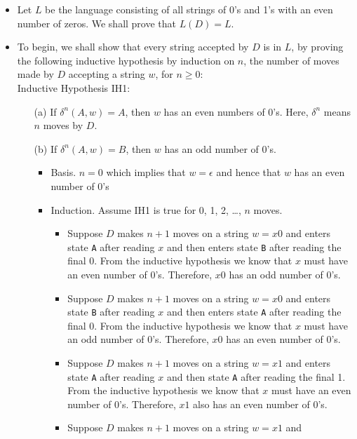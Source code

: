 \documentclass[]{article}
\begin{document}
\begin{itemize}
    \item Let $L$ be the language consisting of all strings of 0's and 1's with
    an even number of zeros. We shall prove that $L(D) = L$.
    \item To begin, we shall show that every string accepted by $D$ is in $L$,
    by proving the following inductive hypothesis by induction on $n$, the
    number of moves made by $D$ accepting a string $w$, for $n \geq 0$: \\
    Inductive Hypothesis IH1:
      \begin{enumerate}
        \item[(a)] If $\delta^n(A, w) = A$, then $w$ has an even numbers of 0's.
        Here, $\delta^n$ means $n$ moves by $D$.
        \item[(b)] If $\delta^n(A, w) = B$, then $w$ has an odd number of 0's.
          \begin{itemize}
            \item Basis. $n = 0$ which implies that $w = \epsilon$ and hence
            that $w$ has an even number of 0's
            \item Induction. Assume IH1 is true for 0, 1, 2, \ldots, $n$ moves.
              \begin{itemize}
                \item Suppose $D$ makes $n + 1$ moves on a string $w = x0$ and
                enters state \texttt{A} after reading $x$ and then enters state
                \texttt{B} after reading the final 0. From the inductive
                hypothesis we know that $x$ must have an even number of 0's.
                Therefore, $x0$ has an odd number of 0's.
                \item Suppose $D$ makes $n + 1$ moves on a string $w = x0$ and
                enters state \texttt{B} after reading $x$ and then enters state
                \texttt{A} after reading the final 0. From the inductive
                hypothesis we know that $x$ must have an odd number of 0's.
                Therefore, $x0$ has an even number of 0's.
                \item Suppose $D$ makes $n + 1$ moves on a string $w = x1$ and
                enters state \texttt{A} after reading $x$ and then state
                \texttt{A} after reading the final 1. From the inductive
                hypothesis we know that $x$ must have an even number of 0's.
                Therefore, $x1$ also has an even number of 0's.
                \item Suppose $D$ makes $n + 1$ moves on a string $w = x1$ and

\end{itemize}
\end{itemize}
\end{enumerate}
\end{itemize}
\end{document}
